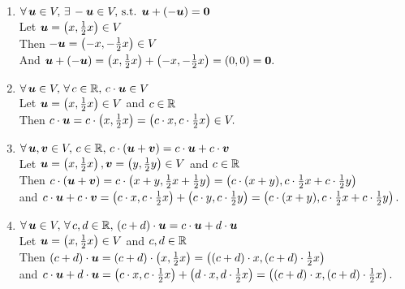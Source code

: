 \documentclass{report}
\begin{document}
{\begin{enumerate}
        \item \( \forall\,  \boldsymbol{u} \in V,\, \exists\, - \boldsymbol{u} \in V,\, \text{s.t. } \boldsymbol{u} + ( - \boldsymbol{u}) = \boldsymbol{0} \) \\
                Let \( \boldsymbol{u} = \left( x, \frac{1}{2}x \right) \in V \) \\
                Then \( - \boldsymbol{u} = \left( - x, - \frac{1}{2}x \right) \in V \) \\
                And \( \boldsymbol{u} + ( - \boldsymbol{u}) = \left( x, \frac{1}{2}x \right) + \left( - x, - \frac{1}{2}x \right) = \left( 0, 0 \right) = \boldsymbol{0}. \)
        \item \( \forall\, \boldsymbol{u} \in V,\, \forall\, c \in \mathbb{R} ,\, c \cdot \boldsymbol{u} \in V \) \\
                Let \( \boldsymbol{u} = \left( x, \frac{1}{2}x \right) \in V \) and \( c \in \mathbb{R} \) \\
                Then \( c \cdot \boldsymbol{u} = c \cdot \left( x, \frac{1}{2}x \right) = \left( c \cdot x, c \cdot \frac{1}{2}x \right) \in V. \)
        \item \( \forall\, \boldsymbol{u}, \boldsymbol{v} \in V,\, c \in \mathbb{R} ,\, c \cdot (\boldsymbol{u} + \boldsymbol{v}) = c \cdot \boldsymbol{u} + c \cdot \boldsymbol{v} \) \\
                Let \( \boldsymbol{u} = \left( x, \frac{1}{2}x \right), \boldsymbol{v} = \left( y, \frac{1}{2}y \right) \in V \) and \( c \in \mathbb{R} \) \\
                Then \( c \cdot (\boldsymbol{u} + \boldsymbol{v}) = c \cdot \left( x + y, \frac{1}{2}x + \frac{1}{2}y \right) = \left( c \cdot (x + y), c \cdot \frac{1}{2}x + c \cdot \frac{1}{2}y \right) \) \\
                and \( c \cdot \boldsymbol{u} + c \cdot \boldsymbol{v} = \left( c \cdot x, c \cdot \frac{1}{2}x \right) + \left( c \cdot y, c \cdot \frac{1}{2}y \right) = \left( c \cdot (x + y), c \cdot \frac{1}{2}x + c \cdot \frac{1}{2}y \right). \)
        \item \( \forall\, \boldsymbol{u} \in V,\, \forall\, c, d \in \mathbb{R} ,\, (c + d) \cdot \boldsymbol{u} = c \cdot \boldsymbol{u} + d \cdot \boldsymbol{u} \) \\
                Let \( \boldsymbol{u} = \left( x, \frac{1}{2}x \right) \in V \) and \( c, d \in \mathbb{R} \) \\
                Then \( (c + d) \cdot \boldsymbol{u} = (c + d) \cdot \left( x, \frac{1}{2}x \right) = \left( (c + d) \cdot x, (c + d) \cdot \frac{1}{2}x \right) \) \\
                and \( c \cdot \boldsymbol{u} + d \cdot \boldsymbol{u} = \left( c \cdot x, c \cdot \frac{1}{2}x \right) + \left( d \cdot x, d \cdot \frac{1}{2}x \right) = \left( (c + d) \cdot x, (c + d) \cdot \frac{1}{2}x \right). \)

\end{enumerate}}
\end{document}
